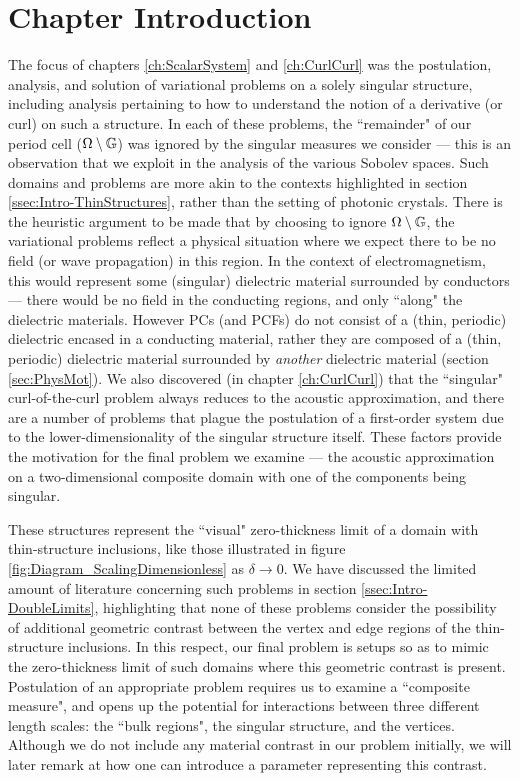 \section{Chapter Introduction} \label{sec:SingIncChapterIntro}
The focus of chapters \ref{ch:ScalarSystem} and \ref{ch:CurlCurl} was the postulation, analysis, and solution of variational problems on a solely singular structure, including analysis pertaining to how to understand the notion of a derivative (or curl) on such a structure.
In each of these problems, the ``remainder" of our period cell ($\Omega\setminus\mathbb{G}$) was ignored by the singular measures we consider --- this is an observation that we exploit in the analysis of the various Sobolev spaces.
Such domains and problems are more akin to the contexts highlighted in section \ref{ssec:Intro-ThinStructures}, rather than the setting of photonic crystals.
There is the heuristic argument to be made that by choosing to ignore $\Omega\setminus\mathbb{G}$, the variational problems reflect a physical situation where we expect there to be no field (or wave propagation) in this region.
In the context of electromagnetism, this would represent some (singular) dielectric material surrounded by conductors --- there would be no field in the conducting regions, and only ``along" the dielectric materials.
However PCs (and PCFs) do not consist of a (thin, periodic) dielectric encased in a conducting material, rather they are composed of a (thin, periodic) dielectric material surrounded by \emph{another} dielectric material (section \ref{sec:PhysMot}).
We also discovered (in chapter \ref{ch:CurlCurl}) that the ``singular" curl-of-the-curl problem always reduces to the acoustic approximation, and there are a number of problems that plague the postulation of a first-order system due to the lower-dimensionality of the singular structure itself.
These factors provide the motivation for the final problem we examine --- the acoustic approximation on a two-dimensional composite domain with one of the components being singular.

These structures represent the ``visual" zero-thickness limit of a domain with thin-structure inclusions, like those illustrated in figure \ref{fig:Diagram_ScalingDimensionless} as $\delta\rightarrow0$.
We have discussed the limited amount of literature concerning such problems in section \ref{ssec:Intro-DoubleLimits}, highlighting that none of these problems consider the possibility of additional geometric contrast between the vertex and edge regions of the thin-structure inclusions.
In this respect, our final problem is setups so as to mimic the zero-thickness limit of such domains where this geometric contrast is present.
Postulation of an appropriate problem requires us to examine a ``composite measure", and opens up the potential for interactions between three different length scales: the ``bulk regions", the singular structure, and the vertices.
Although we do not include any material contrast in our problem initially, we will later remark at how one can introduce a parameter representing this contrast.

